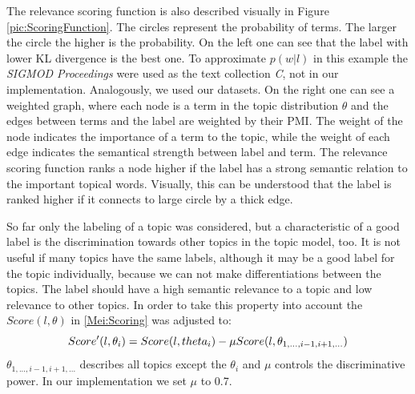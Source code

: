 The relevance scoring function is also described visually in Figure \ref{pic:ScoringFunction}. The circles represent the probability of terms. The larger the circle the higher is the probability. On the left one can see that the label with lower \ac{KL} divergence is the best one. To approximate $p(w|l)$ in this example the \textit{SIGMOD Proceedings} were used as the text collection \textit{C}, not in our implementation. Analogously, we used our datasets. On the right one can see a weighted graph, where each node is a term in the topic distribution $\theta$ and the edges between terms and the label are weighted by their \ac{PMI}. The weight of the node indicates the importance of a term to the topic, while the weight of each edge indicates the semantical strength between label and term. The relevance scoring function ranks a node higher if the label has a strong semantic relation to the important topical words. Visually, this can be understood that the label is ranked higher if it connects to large circle by a thick edge.

So far only the labeling of a topic was considered, but a characteristic of a good label is the discrimination towards other topics in the topic model, too. It is not useful if many topics have the same labels, although it may be a good label for the topic individually, because we can not make differentiations between the topics. The label should have a high semantic relevance to a topic and low relevance to other topics. In order to take this property into account the $Score(l,\theta)$ in \ref{Mei:Scoring} was adjusted to: 
\begin{equation}
Score'(l,\theta_{i}) = Score(l,\\theta_{i}) - \mu Score(l,\theta_{1,...,i-1,i+1,...})
\end{equation}
$\theta_{1,...,i-1,i+1,...}$ describes all topics except the $\theta_{i}$ and $\mu$ controls the discriminative power. In our implementation we set $\mu$ to 0.7.


